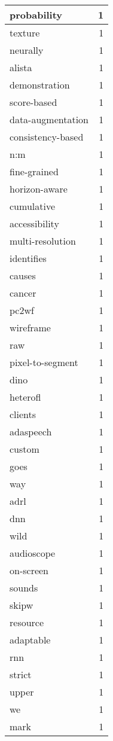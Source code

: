 \begin{table}[h]
\begin{tabular}{|l|r|}
\hline
probability & 1 \\
\hline
texture & 1 \\
\hline
neurally & 1 \\
\hline
alista & 1 \\
\hline
demonstration & 1 \\
\hline
score-based & 1 \\
\hline
data-augmentation & 1 \\
\hline
consistency-based & 1 \\
\hline
n:m & 1 \\
\hline
fine-grained & 1 \\
\hline
horizon-aware & 1 \\
\hline
cumulative & 1 \\
\hline
accessibility & 1 \\
\hline
multi-resolution & 1 \\
\hline
identifies & 1 \\
\hline
causes & 1 \\
\hline
cancer & 1 \\
\hline
pc2wf & 1 \\
\hline
wireframe & 1 \\
\hline
raw & 1 \\
\hline
pixel-to-segment & 1 \\
\hline
dino & 1 \\
\hline
heterofl & 1 \\
\hline
clients & 1 \\
\hline
adaspeech & 1 \\
\hline
custom & 1 \\
\hline
goes & 1 \\
\hline
way & 1 \\
\hline
adrl & 1 \\
\hline
dnn & 1 \\
\hline
wild & 1 \\
\hline
audioscope & 1 \\
\hline
on-screen & 1 \\
\hline
sounds & 1 \\
\hline
skipw & 1 \\
\hline
resource & 1 \\
\hline
adaptable & 1 \\
\hline
rnn & 1 \\
\hline
strict & 1 \\
\hline
upper & 1 \\
\hline
we & 1 \\
\hline
mark & 1 \\

\end{tabular}
\end{table}
